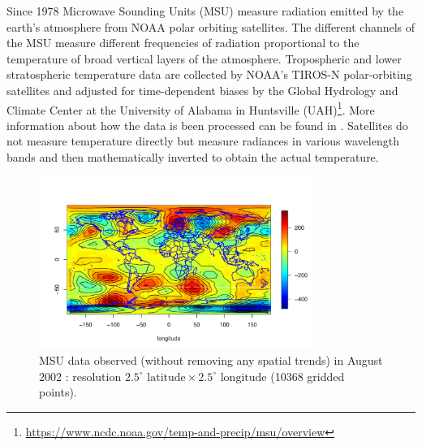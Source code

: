 Since 1978 Microwave Sounding Units (MSU) measure radiation emitted by the earth's atmosphere from NOAA polar orbiting satellites. The different channels of the MSU measure different frequencies of radiation proportional to the temperature of broad vertical layers of the atmosphere. Tropospheric and lower stratospheric temperature data are collected by NOAA's TIROS-N polar-orbiting satellites and adjusted for time-dependent biases by the Global Hydrology and Climate Center at the University of Alabama in Huntsville (UAH)\footnote{\url{https://www.ncdc.noaa.gov/temp-and-precip/msu/overview}}. More information about how the data is been processed can be found in \cite{ChristySpencerBraswell2000}. Satellites do not measure temperature directly but measure radiances in various wavelength bands and then mathematically inverted to obtain the actual temperature. 


\begin{figure}[H]
\label{MSU_data}
\centering
\includegraphics [width=0.8\textwidth, keepaspectratio]{graphs/MSU_data.pdf}
\caption{MSU data observed (without removing any spatial trends) in August 2002 : resolution $2.5^\circ \mbox{ latitude} \times 2.5^\circ \mbox{ longitude}$ (10368 gridded points).}
\end{figure}
\vfill



